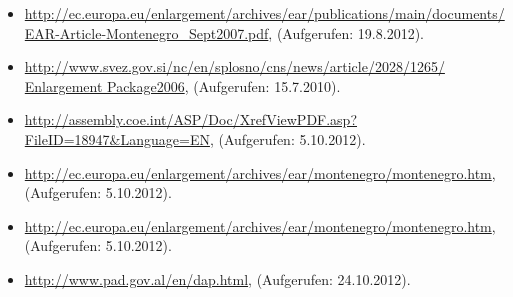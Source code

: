 \begin{itemize}[label={},itemsep=0pt]
\item\url{http://ec.europa.eu/enlargement/archives/ear/publications/main/documents/
EAR-Article-Montenegro_Sept2007.pdf}, (Aufgerufen: 19.8.2012).
\item\url{http://www.svez.gov.si/nc/en/splosno/cns/news/article/2028/1265/ Enlargement Package2006}, (Aufgerufen: 15.7.2010).
\item\url{http://assembly.coe.int/ASP/Doc/XrefViewPDF.asp?FileID=18947&Language=EN}, (Aufgerufen: 5.10.2012).
\item\url{http://ec.europa.eu/enlargement/archives/ear/montenegro/montenegro.htm}, (Aufgerufen: 5.10.2012).
\item\url{http://ec.europa.eu/enlargement/archives/ear/montenegro/montenegro.htm}, (Aufgerufen: 5.10.2012).
\item\url{http://www.pad.gov.al/en/dap.html}, (Aufgerufen: 24.10.2012).
\end{itemize}
